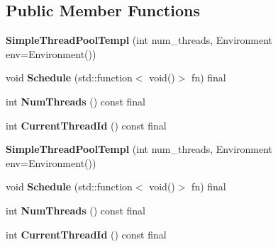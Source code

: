 \subsection*{Public Member Functions}
\begin{DoxyCompactItemize}
\item 
\mbox{\label{class_eigen_1_1_simple_thread_pool_templ_a2bb864f50bfe2c10bc85abd6118f617b}} 
{\bfseries Simple\+Thread\+Pool\+Templ} (int num\+\_\+threads, Environment env=Environment())
\item 
\mbox{\label{class_eigen_1_1_simple_thread_pool_templ_a17eb894c96e45d0eec8669f0585b9847}} 
void {\bfseries Schedule} (std\+::function$<$ void()$>$ fn) final
\item 
\mbox{\label{class_eigen_1_1_simple_thread_pool_templ_af2b4abe6129bafe1f879793527e87de4}} 
int {\bfseries Num\+Threads} () const final
\item 
\mbox{\label{class_eigen_1_1_simple_thread_pool_templ_a9413d75032db4ad4b7a230d383efdaf4}} 
int {\bfseries Current\+Thread\+Id} () const final
\item 
\mbox{\label{class_eigen_1_1_simple_thread_pool_templ_a2bb864f50bfe2c10bc85abd6118f617b}} 
{\bfseries Simple\+Thread\+Pool\+Templ} (int num\+\_\+threads, Environment env=Environment())
\item 
\mbox{\label{class_eigen_1_1_simple_thread_pool_templ_a17eb894c96e45d0eec8669f0585b9847}} 
void {\bfseries Schedule} (std\+::function$<$ void()$>$ fn) final
\item 
\mbox{\label{class_eigen_1_1_simple_thread_pool_templ_af2b4abe6129bafe1f879793527e87de4}} 
int {\bfseries Num\+Threads} () const final
\item 
\mbox{\label{class_eigen_1_1_simple_thread_pool_templ_a9413d75032db4ad4b7a230d383efdaf4}} 
int {\bfseries Current\+Thread\+Id} () const final
\end{DoxyCompactItemize}
